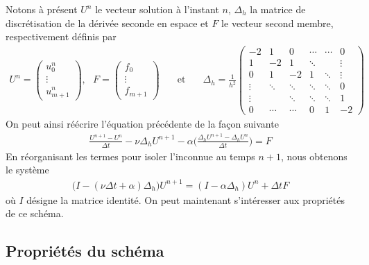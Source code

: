 Notons à présent $U^n$ le vecteur solution à l'instant $n$, $\Delta_h$ la matrice de discrétisation de la dérivée seconde en espace et $F$ le vecteur second membre, respectivement définis par 
\begin{eqnarray*}
    U^n = \begin{pmatrix}
        u_0^n \\
        \vdots \\
        u_{m+1}^n
    \end{pmatrix}, \ \ \ F=\begin{pmatrix}
        f_0 \\
        \vdots \\
        f_{m+1}
    \end{pmatrix} \ \ \ &\text{ et }& \ \ \ 
    \Delta_h = \frac{1}{h^2}\begin{pmatrix}
        -2 & 1 & 0 & \cdots & \cdots & 0 \\
        1 & -2 & 1 & \ddots &  & \vdots \\
        0 & 1 & -2 & 1 & \ddots & \vdots \\
        \vdots & \ddots & \ddots & \ddots & \ddots & 0 \\
        \vdots &  & \ddots & \ddots & \ddots & 1 \\
        0 & \cdots & \cdots & 0 & 1 & -2 
    \end{pmatrix}
\end{eqnarray*}
On peut ainsi réécrire l'équation précédente de la façon suivante
\begin{eqnarray*}
    \frac{U^{n+1} - U^n}{\Delta t} - \nu \Delta _h U^{n+1} - \alpha\bigg(\frac{\Delta_h U^{n+1} - \Delta_h U^n}{\Delta t} \bigg) = F
\end{eqnarray*}
En réorganisant les termes pour isoler l'inconnue au temps $n+1$, nous obtenons le système 
\begin{eqnarray}\label{schema_DF}
    \big(I - (\nu \Delta t + \alpha)\Delta_h\big)  U^{n+1} = (I - \alpha \Delta_h) U^n + \Delta t F
\end{eqnarray}
où $I$ désigne la matrice identité. On peut maintenant s'intéresser aux propriétés de ce schéma.

\subsection{Propriétés du schéma}
